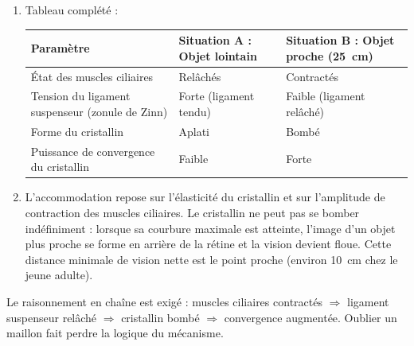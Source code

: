 \documentclass[11pt]{article}
\newcommand{\cle}[1]{{\popxbold\color{popdark}#1}}
\begin{document}
\begin{corrige}
\begin{enumerate}
\item Tableau complété :
\begin{center}
\begin{tabularx}{\linewidth}{|l|X|X|}\hline
\rowcolor{popblueL}
\textbf{Paramètre} & \textbf{Situation A : Objet lointain} & \textbf{Situation B : Objet proche (\SI{25}{cm})} \\ \hline
État des muscles ciliaires & Relâchés & Contractés \\ \hline
Tension du ligament suspenseur (zonule de Zinn) & Forte (ligament tendu) & Faible (ligament relâché) \\ \hline
Forme du cristallin & Aplati & Bombé \\ \hline
Puissance de convergence du cristallin & Faible & Forte \\ \hline
\end{tabularx}
\end{center}
\item L'accommodation repose sur l'élasticité du cristallin et sur l'amplitude de contraction des muscles ciliaires. Le cristallin ne peut pas se bomber indéfiniment : lorsque sa courbure maximale est atteinte, l'image d'un objet plus proche se forme en arrière de la rétine et la vision devient floue. Cette distance minimale de vision nette est le \cle{point proche} (environ \SI{10}{cm} chez le jeune adulte).
\end{enumerate}
\end{corrige}

\begin{attention}
Le raisonnement en chaîne est exigé : muscles ciliaires contractés $\Rightarrow$ ligament suspenseur relâché $\Rightarrow$ cristallin bombé $\Rightarrow$ convergence augmentée. Oublier un maillon fait perdre la logique du mécanisme.
\end{attention}
\end{document}
